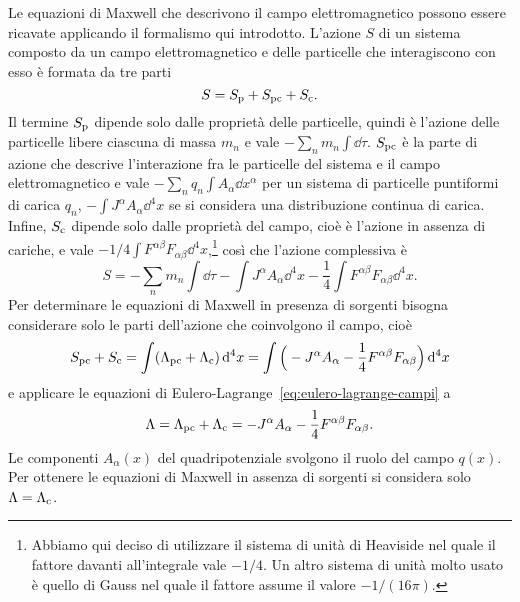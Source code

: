 Le equazioni di Maxwell che descrivono il campo elettromagnetico possono essere
ricavate applicando il formalismo qui introdotto.  L'azione $S$ di un sistema
composto da un campo elettromagnetico e delle particelle che interagiscono con
esso è formata da tre parti
\begin{equation}
  S = S_{\textup{p}} + S_{\textup{pc}} + S_{\textup{c}}.
\end{equation}
Il termine $S_{\textup{p}}$ dipende solo dalle proprietà delle particelle,
quindi è l'azione delle particelle libere ciascuna di massa $m_{n}$ e vale
$-\sum_{n} m_{n}\int\dd \tau$.  $S_{\textup{pc}}$ è la parte di azione che
descrive l'interazione fra le particelle del sistema e il campo elettromagnetico
e vale $-\sum_{n} q_{n}\int A_{\alpha}\dd x^{\alpha}$ per un sistema di
particelle puntiformi di carica $q_{n}$, $-\int J^{\alpha}A_{\alpha}\dd^{4} x$
se si considera una distribuzione continua di carica.  Infine, $S_{\textup{c}}$
dipende solo dalle proprietà del campo, cioè è l'azione in assenza di cariche, e
vale $-1/4 \int F^{\alpha\beta}F_{\alpha\beta}\dd^{4}
x$,\footnote{Abbiamo
  qui deciso di utilizzare il sistema di unità di Heaviside nel quale il fattore
  davanti all'integrale vale $-1/4$.  Un altro sistema di unità molto usato è
  quello di Gauss nel quale il fattore assume il valore $-1/(16\pi)$.}
così che l'azione complessiva è
\begin{equation}
  S = -\sum_{n} m_{n}\int \dd\tau - \int J^{\alpha}A_{\alpha} \dd^{4} x
  -\frac{1}{4} \int F^{\alpha\beta}F_{\alpha\beta} \dd^{4} x.
\end{equation}
Per determinare le equazioni di Maxwell in presenza di sorgenti bisogna
considerare solo le parti dell'azione che coinvolgono il campo, cioè
\begin{equation}
  S_{\textup{pc}} + S_{\textup{c}} =  \int (\Lambda_{\textup{pc}} +
  \Lambda_{\textup{c}}) \mathop{}\!\mathrm{d}^{4} x = \int \Big( -J^{\alpha}A_{\alpha}
  -\frac{1}{4} F^{\alpha\beta}F_{\alpha\beta} \Big) \mathop{}\!\mathrm{d}^{4} x
\end{equation}
e applicare le equazioni di Eulero-Lagrange~\eqref{eq:eulero-lagrange-campi} a
\begin{equation}
  \Lambda = \Lambda_{\textup{pc}} + \Lambda_{\textup{c}} = -J^{\alpha}A_{\alpha}
  -\frac{1}{4} F^{\alpha\beta}F_{\alpha\beta}.
\end{equation}
Le componenti $A_{\alpha}(x)$ del quadripotenziale svolgono il ruolo del campo
$q(x)$.  Per ottenere le equazioni di Maxwell in assenza di sorgenti si
considera solo $\Lambda = \Lambda_{\textup{c}}$.

